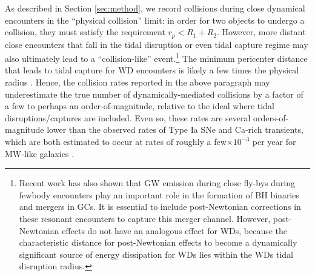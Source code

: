 \documentclass[twocolumn,tighten]{aastex63}
\begin{document}
As described in Section \ref{sec:method}, we record collisions during close dynamical encounters in the ``physical collision'' limit: in order for two objects to undergo a collision, they must satisfy the requirement $r_p < R_1 + R_2$. However, more distant close encounters that fall in the tidal disruption or even tidal capture regime may also ultimately lead to a ``collision-like'' event.\footnote{Recent work \citep[e.g.,][]{Samsing2018a,Rodriguez2018b} has also shown that GW emission during close fly-bys during fewbody encounters play an important role in the formation of BH binaries and mergers in GCs. It is essential to include post-Newtonian corrections in these resonant encounters to capture this merger channel. However, post-Newtonian effects do not have an analogous effect for WDs, because the characteristic distance for post-Newtonian effects to become a dynamically significant source of energy dissipation for WDs lies within the WDs tidal disruption radius.} The minimum pericenter distance that leads to tidal capture for WD encounters is likely a few times the physical radius \citep[e.g.,][]{SamsingLeighTrani2018}. Hence, the collision rates reported in the above paragraph may underestimate the true number of dynamically-mediated collisions by a factor of a few to perhaps an order-of-magnitude, relative to the ideal where tidal disruptions/captures are included. Even so, these rates are several orders-of-magnitude lower than the observed rates of Type Ia SNe and Ca-rich transients, which are both estimated to occur at rates of roughly a few$\times 10^{-3}$ per year for MW-like galaxies \citep[e.g.,][]{Frohmaier2018}.
\end{document}
